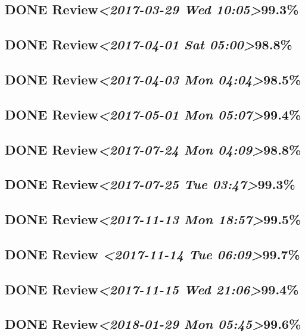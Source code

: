 \documentclass[11pt]{ctexart}
\begin{document}
\subsection{{\bfseries\sffamily DONE} Review\textit{<2017-03-29 Wed 10:05>}99.3\%}
\label{sec:org70abba7}
\subsection{{\bfseries\sffamily DONE} Review\textit{<2017-04-01 Sat 05:00>}98.8\%}
\label{sec:orgd6299f6}
\subsection{{\bfseries\sffamily DONE} Review\textit{<2017-04-03 Mon 04:04>}98.5\%}
\label{sec:org6c242b1}
\subsection{{\bfseries\sffamily DONE} Review\textit{<2017-05-01 Mon 05:07>}99.4\%}
\label{sec:orgb3c513f}
\subsection{{\bfseries\sffamily DONE} Review\textit{<2017-07-24 Mon 04:09>}98.8\%}
\label{sec:org2a901a7}
\subsection{{\bfseries\sffamily DONE} Review\textit{<2017-07-25 Tue 03:47>}99.3\%}
\label{sec:org35de53a}

\subsection{{\bfseries\sffamily DONE} Review\textit{<2017-11-13 Mon 18:57>}99.5\%}
\label{sec:org757cef7}
\subsection{{\bfseries\sffamily DONE} Review \textit{<2017-11-14 Tue 06:09>}99.7\%}
\label{sec:orgb1ecc35}
\subsection{{\bfseries\sffamily DONE} Review\textit{<2017-11-15 Wed 21:06>}99.4\%}
\label{sec:org856eadb}
\subsection{{\bfseries\sffamily DONE} Review\textit{<2018-01-29 Mon 05:45>}99.6\%}
\label{sec:org43e2168}
\end{document}
